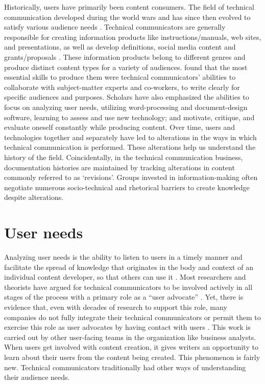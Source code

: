 Historically, users have primarily been content consumers. The field of technical communication developed during the world wars and has since then evolved to satisfy various audience needs \cite{swarts2018wicked}. Technical communicators are generally responsible for creating information products like instructions/manuals, web sites, and presentations, as well as develop definitions, social media content and grants/proposals \cite{blythe2014professional, kimball2015training, baehr2015complexities, dubinsky2015products}. These information products belong to different genres and produce distinct content types for a variety of audiences. \textcite{brumberger2015evolution} found that the most essential skills to produce them were technical communicators’ abilities to collaborate with subject-matter experts and co-workers, to write clearly for specific audiences and purposes. Scholars have also emphasized the abilities to focus on analyzing user needs, utilizing word-processing and document-design software, learning to assess and use new technology; and motivate, critique, and evaluate oneself constantly \cite{rainey2005curricula} while producing content. Over time, users and technologies together and separately have led to alterations in the ways in which technical communication is performed. These alterations help us understand the history of the field. Coincidentally, in the technical communication business, documentation histories are maintained by tracking alterations in content commonly referred to as ‘revisions’. Groups invested in information-making often negotiate numerous socio-technical and rhetorical barriers \cite{coppola2006guest, doheny1992rhetoric} to create knowledge despite alterations. 

\section{User needs}
Analyzing user needs is the ability to listen to users in a timely manner and facilitate the spread of knowledge that originates in the body and context of an individual content developer, so that others can use it \cite{johnson2013solving}. Most researchers and theorists have argued for technical communicators to be involved actively in all stages of the process with a primary role as a “user advocate” \cite{carroll1996ten, redish2010technical, spinuzzi2000investigating}. Yet, there is evidence that, even with decades of research to support this role, many companies do not fully integrate their technical communicators or permit them to exercise this role as user advocates by having contact with users \cite{virtaluoto2014death}. This work is carried out by other user-facing teams in the organization like business analysts. When users get involved with content creation, it gives writers an opportunity to learn about their users from the content being created. This phenomenon is fairly new. Technical communicators traditionally had other ways of understanding their audience needs.

